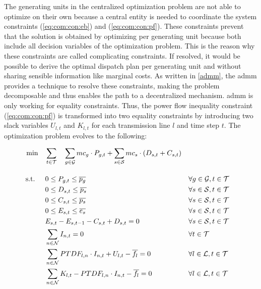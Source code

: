 The generating units in the centralized optimization problem are not able to optimize on their own because a central entity is needed to coordinate the system constraints (\ref{eq:com:con:eb}) and (\ref{eq:com:con:pf}). These constraints prevent that the solution is obtained by optimizing per generating unit because both include all decision variables of the optimization problem. This is the reason why these constraints are called complicating constraints. If resolved, it would be possible to derive the optimal dispatch plan per generating unit and without sharing sensible information like marginal costs. As written in \ref{admm}, the \gls{admm} provides a technique to resolve these constraints, making the problem decomposable and thus enables the path to a decentralized mechanism. \gls{admm} is only working for equality constraints. Thus, the power flow inequality constraint (\ref{eq:com:con:pf}) is transformed into two equality constraints by introducing two slack variables $U_{l,t}$ and $K_{l,t}$ for each transmission line $l$ and time step $t$. The optimization problem evolves to the following:

\begin{subequations}
	\begin{align}
		 \min \quad & \sum_{t\in\mathcal{T}} \quad \sum_{g\in\mathcal{G}}mc_g \cdot P_{g,t} + \sum_{s\in\mathcal{S}}mc_s \cdot (D_{s,t}+C_{s,t}) \label{eq:dom:relaxed-constraints}\\[10pt]
		 \text{s.t. } \quad & 0 \leq P_{g,t} \leq \overline{p_g} && \forall g \in \mathcal{G}, t \in \mathcal{T}\\
		 & 0 \leq D_{s,t} \leq \overline{p_s} && \forall s \in \mathcal{S}, t \in \mathcal{T} \\
		 & 0 \leq C_{s,t} \leq \overline{p_s} && \forall s \in \mathcal{S}, t \in \mathcal{T} \\
		 & 0 \leq E_{s,t} \leq \overline{e_s} && \forall s \in \mathcal{S}, t \in \mathcal{T} \\
		 & E_{s,t} - E_{s,t-1} - C_{s,t} + D_{s,t} = 0 && \forall s \in \mathcal{S}, t \in \mathcal{T}\\
		 & \sum_{n \in \mathcal{N}} I_{n,t} = 0 && \forall t \in \mathcal{T} \\
		 & \sum_{n \in \mathcal{N}} PTDF_{l,n} \cdot I_{n,t} + U_{l,t} - \overline{f_l} = 0 && \forall l \in \mathcal{L}, t \in \mathcal{T} \label{eq:dom:con:pf-upper} \\
		 & \sum_{n \in \mathcal{N}} K_{l,t} - PTDF_{l,n} \cdot I_{n,t} - \overline{f_l} = 0 && \forall l \in \mathcal{L}, t \in \mathcal{T} \label{eq:dom:con:pf-lower}
	\end{align}
\end{subequations}

